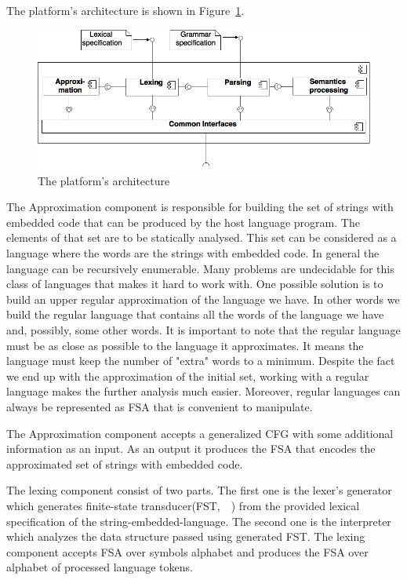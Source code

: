 \documentclass{sig-alternate-05-2015}
\begin{document}
The platform's architecture is shown in Figure~\ref{platform_architecture_ref}.

\begin{figure}[h!]
    \begin{center}
        \includegraphics[scale=0.3]{Figures/SELYCcomponents.png}
    \end{center}
    \caption{The platform's architecture}
    \label{platform_architecture_ref}
\end{figure} 

The Approximation component is responsible for building the set of strings with embedded code that can be produced by the host language program. The elements of that set are to be statically analysed. This set can be considered as a language where the words are the strings with embedded code. In general the language can be recursively enumerable. Many problems are undecidable for this class of languages that makes it hard to work with. One possible solution is to build an upper regular approximation of the language we have. In other words we build the regular language that contains all the words of the language we have and, possibly, some other words. It is important to note that the regular language must be as close as possible to the language it approximates. It means the language must keep the number of "extra" words to a minimum. Despite the fact we end up with the approximation of the initial set, working with a regular language makes the further analysis much easier. Moreover, regular languages can always be represented as FSA that is convenient to manipulate.

The Approximation component accepts a generalized CFG with some additional information as an input. As an output it produces the FSA that encodes the approximated set of strings with embedded code.

The lexing component consist of two parts. The first one is the lexer's generator which generates finite-state transducer(FST,~~\cite{FST:ref}) from the provided lexical specification of the string-embedded-language. The second one is the interpreter which analyzes the data structure passed using generated FST. The lexing component accepts FSA over symbols alphabet and produces the FSA over alphabet of processed language tokens.
\end{document}
